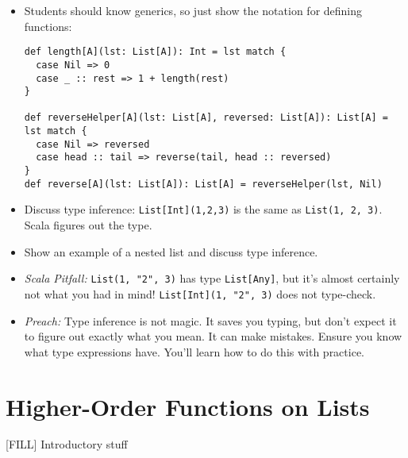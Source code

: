 \documentclass{book}
\begin{document}
\begin{itemize}

\item Students should know generics, so just show the notation for defining
functions:
%
\begin{verbatim}
def length[A](lst: List[A]): Int = lst match {
  case Nil => 0
  case _ :: rest => 1 + length(rest)
}

def reverseHelper[A](lst: List[A], reversed: List[A]): List[A] = lst match {
  case Nil => reversed
  case head :: tail => reverse(tail, head :: reversed)
}
def reverse[A](lst: List[A]): List[A] = reverseHelper(lst, Nil)
\end{verbatim}


\item Discuss type inference: \verb|List[Int](1,2,3)| is the same as
\verb|List(1, 2, 3)|. Scala figures out the type.

\item Show an example of a nested list and discuss type inference.

\item \emph{Scala Pitfall:} \verb|List(1, "2", 3)| has type \verb|List[Any]|,
but it's almost certainly not what you had in mind!
\verb|List[Int](1, "2", 3)| does not type-check.

\item \emph{Preach:} Type inference is not magic. It saves you typing, but
don't expect it to figure out exactly what you mean. It can make mistakes.
Ensure you know what type expressions have. You'll learn how to do this
with practice.

\end{itemize}

\section{Higher-Order Functions on Lists}

[FILL] Introductory stuff
\end{document}
